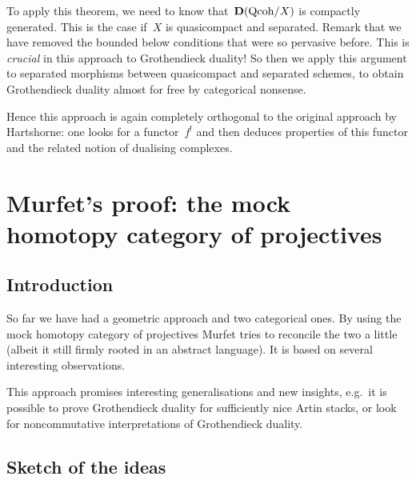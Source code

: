 \documentclass[10pt,a4paper]{article}
\begin{document}
To apply this theorem, we need to know that~$\mathbf{D}(\mathrm{Qcoh}/X)$ is compactly generated. This is the case if~$X$ is quasicompact and separated. Remark that we have removed the bounded below conditions that were so pervasive before. This is \emph{crucial} in this approach to Grothendieck duality! So then we apply this argument to separated morphisms between quasicompact and separated schemes, to obtain Grothendieck duality almost for free by categorical nonsense.

Hence this approach is again completely orthogonal to the original approach by Hartshorne: one looks for a functor~$f^!$ and then deduces properties of this functor and the related notion of dualising complexes.

\section{Murfet's proof: the mock homotopy category of projectives}
\label{section:murfet}
\subsection{Introduction}
So far we have had a geometric approach and two categorical ones. By using the mock homotopy category of projectives Murfet tries to reconcile the two a little (albeit it still firmly rooted in an abstract language). It is based on several interesting observations.

This approach promises interesting generalisations and new insights, e.g.\ it is possible to prove Grothendieck duality for sufficiently nice Artin stacks, or look for noncommutative interpretations of Grothendieck duality.

\subsection{Sketch of the ideas}
\end{document}
